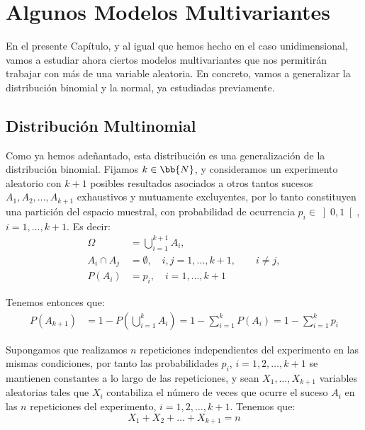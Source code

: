 \chapter{Algunos Modelos Multivariantes}

En el presente Capítulo, y al igual que hemos hecho en el caso unidimensional, vamos a estudiar ahora ciertos modelos multivariantes que nos permitirán trabajar con más de una variable aleatoria.
En concreto, vamos a generalizar la distribución binomial y la normal, ya estudiadas previamente.

\section{Distribución Multinomial}

Como ya hemos adeñantado, esta distribución es una generalización de la distribución binomial.
Fijamos $k\in \bb{N}$, y consideramos un experimento aleatorio con $k+1$ posibles resultados asociados a otros tantos sucesos $A_1, A_2, \ldots, A_{k+1}$ exhaustivos y mutuamente excluyentes, por lo tanto constituyen una partición del espacio muestral, con probabilidad de ocurrencia $p_i \in \left]0,1\right[$, $i=1, \ldots, k+1$. Es decir:
\begin{align*}
    \Omega&=\bigcup_{i=1}^{k+1}A_i,\\
    A_i\cap A_j&=\emptyset, \quad i,j=1, \ldots, k+1,\qquad i\neq j,\\
    P(A_i)&=p_i, \quad i=1, \ldots, k+1
\end{align*}

Tenemos entonces que:
\begin{align*}
    P(A_{k+1})&=1-P\left(\bigcup_{i=1}^k A_i\right)=1-\sum_{i=1}^k P(A_i)=1-\sum_{i=1}^k p_i
\end{align*}

Supongamos que realizamos $n$ repeticiones independientes del experimento en las mismas condiciones, por tanto las probabilidades $p_i$, $i=1, 2, \ldots, k+1$ se mantienen constantes a lo largo de las repeticiones, y sean $X_1, \ldots, X_{k+1}$ variables aleatorias tales que $X_i$ contabiliza el número de veces que ocurre el suceso $A_i$ en las $n$ repeticiones del experimento, $i=1, 2, \ldots, k+1$. Tenemos que:
\begin{equation*}
    X_1+X_2+\ldots+X_{k+1}=n
\end{equation*}

